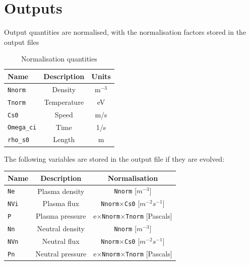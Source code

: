 \documentclass[12pt,a4paper]{article}
\begin{document}
\section{Outputs}
\label{sec:output}

Output quantities are normalised, with the normalisation factors stored in the output files

\begin{table}[h]
\caption{Normalisation quantities}
\label{tab:normalisation}
\begin{center}
\begin{tabular}{l c c}
  Name & Description & Units \\
  \hline
  \texttt{Nnorm}  & Density  & m$^{-3}$\\
  \texttt{Tnorm}  & Temperature  & eV\\
  \texttt{Cs0}  & Speed  & m/s \\
  \texttt{Omega\_ci} & Time & 1/s \\
  \texttt{rho\_s0} & Length & m \\
  \hline
\end{tabular}
\end{center}
\end{table}

\noindent The following variables are stored in the output file if they are evolved:

\begin{center}
\begin{tabular}{l c c}
  Name & Description & Normalisation \\
  \hline
  \texttt{Ne}  & Plasma density  & \texttt{Nnorm} [$m^{-3}$]\\
  \texttt{NVi} & Plasma flux  & \texttt{Nnorm}$\times$\texttt{Cs0} [$m^{-2}s^{-1}$]\\
  \texttt{P}   & Plasma pressure & e$\times$\texttt{Nnorm}$\times$\texttt{Tnorm} [Pascals] \\
  \texttt{Nn}  & Neutral density & \texttt{Nnorm} [$m^{-3}$] \\
  \texttt{NVn} & Neutral flux  & \texttt{Nnorm}$\times$\texttt{Cs0} [$m^{-2}s^{-1}$]\\
  \texttt{Pn}  & Neutral pressure & e$\times$\texttt{Nnorm}$\times$\texttt{Tnorm} [Pascals] \\
  \hline
\end{tabular}
\end{center}
\end{document}
